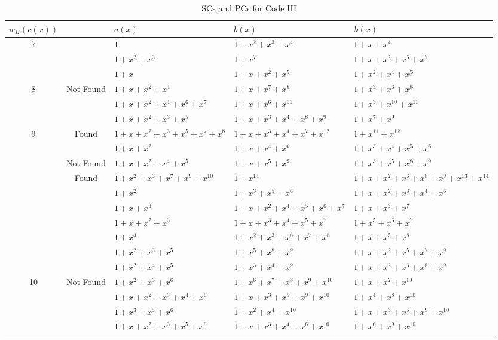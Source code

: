 	\begin{table}[htbp]
		\caption{SCs and PCs for Code III}
		\centering
		\begin{tabularx}{1.2\textwidth}{|c|c|XXX} 
			\toprule
			$w_H(c(x))$&~& $a(x)$ & $b(x)$ & $h(x)$ \\ %
			\midrule
			7&~&$1$ & $1+x^2+x^3+x^4$ & $1+x+x^{4}$\\
			  &~&$1+x^2+x^3$ & $1+x^7$ & $1+x+x^2+x^6+x^7$\\
			\cline{1-5}
			&&$1+x$ 						& $1+x+x^2+x^5$ 			& $1+x^2+x^4+x^5$\\
			8&Not Found&$1+x+x^2+x^4$ 				& $1+x+x^7+x^8$ 			& $1+x^3+x^6+x^8$\\
			&&$1+x+x^2+x^4+x^6+x^7$ 	& $1+x+x^6+x^{11}$ 			& $1+x^3+x^{10}+x^{11}$\\
			\cline{1-5}
			&~&$1+x+x^2+x^3+x^5$ & $1+x+x^3+x^4+x^8+x^9$ & $1+x^7+x^9$\\
			9&Found&$1+x+x^2+x^3+x^5+x^7+x^8$ & $1+x+x^3+x^4+x^7+x^{12}$ & $1+x^{11}+x^{12}$\\
			\cline{2-5}
			 ~&~&$1+x+x^2$ 					& $1+x+x^4+x^6$ 			& $1+x^{3}+x^{4}+x^5+x^6$\\
			&Not Found&$1+x+x^2+x^4+x^5$ 		& $1+x+x^5+x^9$ 			& $1+x^{3}+x^{5}+x^8+x^9$\\
			\cline{1-5}
			&Found&$1+x^2+x^3+x^7+x^9+x^{10}$ & $1+x^{14}$ & $1+x+x^2+x^6+x^8+x^9+x^{13}+x^{14}$\\
						\cline{2-5}
			&&$1+x^2$ 								& $1+x^3+x^5+x^6$ 					& $1+x+x^2+x^{3}+x^{4}+x^6$\\
			&&$1+x+x^3$ 								& $1+x+x^2+x^4+x^5+x^6+x^7$ 	& $1+x+x^{3}+x^{7}$\\
			&&$1+x+x^2+x^3$ 				& $1+x+x^3+x^4+x^5+x^7$ 			& $1+x^{5}+x^6+x^7$\\
			&&$1+x^4$ 								& $1+x^2+x^3+x^6+x^7+x^8$ 		& $1+x+x^{5}+x^8$\\
			&&$1+x^2+x^3+x^5$ 						& $1+x^5+x^8+x^9$ 					& $1+x+x^{2}+x^5+x^7+x^9$\\
			&~&$1+x^2+x^4+x^5$ 						& $1+x^3+x^4+x^9$ 					& $1+x+x^{2}+x^3+x^8+x^9$\\
			10&Not Found&$1+x^2+x^3+x^6$ 						& $1+x^6+x^7+x^8+x^9+x^{10}$ 	& $1+x+x^2+x^{10}$\\
			&&$1+x+x^2+x^3+x^4+x^6$ 				& $1+x+x^3+x^5+x^9+x^{10}$ 		& $1+x^4+x^8+x^{10}$\\
			&&$1+x^3+x^5+x^6$ 						& $1+x^2+x^4+x^{10}$ 				& $1+x+x^{3}+x^{5}+x^9+x^{10}$\\
			&&$1+x+x^2+x^3+x^5+x^6$ 				& $1+x+x^3+x^4+x^6+x^{10}$ 		& $1+x^{6}+x^{9}+x^{10}$\\

\end{tabularx}
\end{table}
